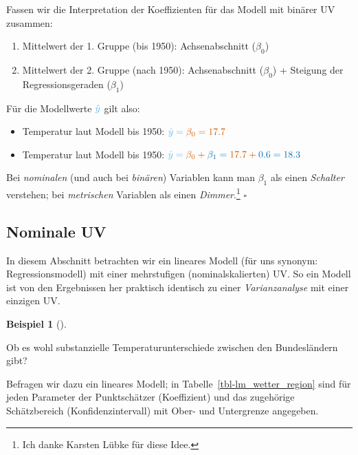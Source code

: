 \documentclass[
  letterpaper,
  twoside,
  open=any]{scrbook}
\providecommand{\tightlist}{%
  \setlength{\itemsep}{0pt}\setlength{\parskip}{0pt}}\usepackage{longtable,booktabs,array}
\theoremstyle{definition}
\theoremstyle{definition}
\theoremstyle{definition}
\newtheorem{example}{Beispiel}[chapter]
\theoremstyle{remark}
\begin{document}
Fassen wir die Interpretation der Koeffizienten für das Modell mit
binärer UV zusammen:

\begin{enumerate}
\def\labelenumi{\arabic{enumi}.}
\tightlist
\item
  Mittelwert der 1. Gruppe (bis 1950): {Achsenabschnitt (\(\beta_0\))}
\item
  Mittelwert der 2. Gruppe (nach 1950): {Achsenabschnitt (\(\beta_0\))}
  + {Steigung der Regressionsgeraden (\(\beta_1\))}
\end{enumerate}

Für die Modellwerte \(\color{modelcol}{\hat{y}}\) gilt also:

\begin{itemize}
\item
  Temperatur laut Modell bis 1950:
  \(\color{modelcol}{\hat{y}} = \color{beta0col}{\beta_0} = 17.7\)
\item
  Temperatur laut Modell bis 1950:
  \(\color{modelcol}{\hat{y}} = \color{beta0col}{\beta_0} +  \color{beta1col}{\beta_1}= \color{beta0col}{17.7} + \color{beta1col}{0.6} = 18.3\)
\end{itemize}

Bei \emph{nominalen} (und auch bei \emph{binären}) Variablen kann man
\({\beta_1}\) als einen \emph{Schalter} verstehen; bei \emph{metrischen}
Variablen als einen \emph{Dimmer}.\footnote{Ich danke Karsten Lübke für
  diese Idee.} \(\square\)

\subsection{Nominale UV}\label{nominale-uv}

In diesem Abschnitt betrachten wir ein lineares Modell (für uns synonym:
Regressionsmodell) mit einer mehrstufigen (nominalskalierten) UV. So ein
Modell ist von den Ergebnissen her praktisch identisch zu einer
\emph{Varianzanalyse} mit einer einzigen UV.

\begin{example}[]\protect\hypertarget{exm-wetter2}{}\label{exm-wetter2}

Ob es wohl substanzielle Temperaturunterschiede zwischen den
Bundesländern gibt?

\end{example}

Befragen wir dazu ein lineares Modell; in
Tabelle~\ref{tbl-lm_wetter_region} sind für jeden Parameter der
Punktschätzer (Koeffizient) und das zugehörige Schätzbereich
(Konfidenzintervall) mit Ober- und Untergrenze angegeben.
\end{document}
